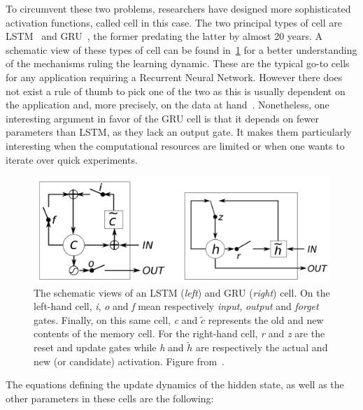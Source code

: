 To circumvent these two problems, researchers have designed more sophisticated activation functions, called cell in this case. The two principal types of cell are LSTM~\cite{doi:10.1162/neco.1997.9.8.1735} and GRU~\cite{DBLP:journals/corr/ChoMGBSB14}, the former predating the latter by almost 20 years. A schematic view of these types of cell can be found in~\ref{fig:cells} for a better understanding of the mechanisms ruling the learning dynamic. These are the typical go-to cells for any application requiring a Recurrent Neural Network. However there does not exist a rule of thumb to pick one of the two as this is usually dependent on the application and, more precisely, on the data at hand~\cite{DBLP:journals/corr/ChungGCB14}. Nonetheless, one interesting argument in favor of the GRU cell is that it depends on fewer parameters than LSTM, as they lack an output gate. It makes them particularly interesting when the computational resources are limited or when one wants to iterate over quick experiments. \\

\begin{figure}
 \centering
 \includegraphics[width=.6\linewidth]{figures/rnn-cells.png}
 \captionsetup{width=.75\linewidth}
 \caption{
  The schematic views of an LSTM (\textit{left}) and GRU (\textit{right}) cell. On the left-hand cell, \emph{i}, \emph{o} and \emph{f} mean respectively \emph{input}, \emph{output} and \emph{forget} gates. Finally, on this same cell, \emph{c} and \emph{$\tilde{c}$} represents the old and new contents of the memory cell. For the right-hand cell, \emph{r} and \emph{z} are the reset and update gates while \emph{h} and \emph{$\tilde{h}$} are respectively the actual and new (or candidate) activation. Figure from~\cite{DBLP:journals/corr/ChungGCB14}.
 }
 \label{fig:cells}
\end{figure}

The equations defining the update dynamics of the hidden state, as well as the other parameters in these cells are the following:

